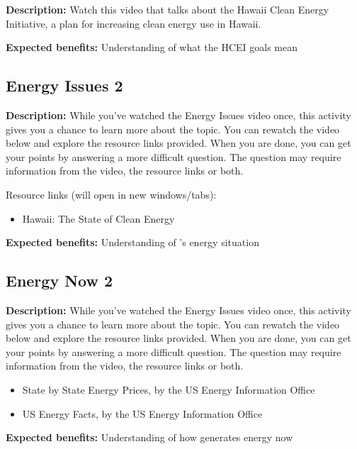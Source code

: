 \textbf{Description:} Watch this video that talks about the Hawaii Clean Energy Initiative, a plan for increasing clean energy use in Hawaii.

\vspace{2ex}
\textbf{Expected benefits:} Understanding of what the HCEI goals mean


\subsection{Energy Issues 2}

\textbf{Description:} While you've watched the Energy Issues video once, this activity gives you a chance to learn more about the topic. You can rewatch the video below and explore the resource links provided. When you are done, you can get your points by answering a more difficult question. The question may require information from the video, the resource links or both.

Resource links (will open in new windows/tabs):

\begin{itemize}
	\item Hawaii: The State of Clean Energy
\end{itemize}

\vspace{2ex}
\textbf{Expected benefits:} Understanding of \Hawaii's energy situation


\subsection{Energy Now 2}

\textbf{Description:} While you've watched the Energy Issues video once, this activity gives you a chance to learn more about the topic. You can rewatch the video below and explore the resource links provided. When you are done, you can get your points by answering a more difficult question. The question may require information from the video, the resource links or both.

\begin{itemize}
	\item State by State Energy Prices, by the US Energy Information Office
	\item US Energy Facts, by the US Energy Information Office
\end{itemize}

\vspace{2ex}
\textbf{Expected benefits:} Understanding of how \Hawaii generates energy now


